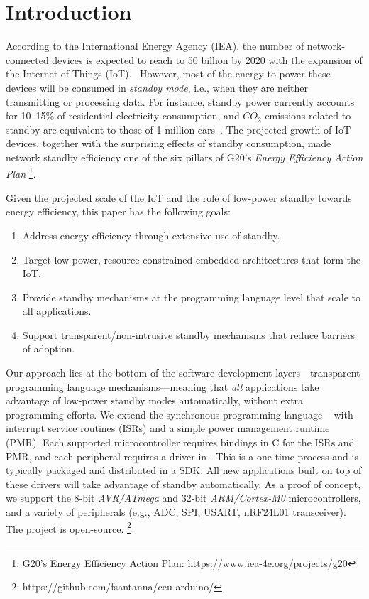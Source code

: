 \section{Introduction}
\label{sec.introduction}

According to the International Energy Agency (IEA), the number of
network-connected devices is expected to reach to 50 billion by 2020 with
the expansion of the Internet of Things (IoT).~\cite{iea.data}
%
However, most of the energy to power these devices will be consumed in
\emph{standby mode}, i.e., when they are neither transmitting or processing
data.
%
For instance, standby power currently accounts for 10--15\% of residential
electricity consumption, and $CO_2$ emissions related to standby are equivalent
to those of 1 million cars~\cite{iea.data,standby.australia}.
%
The projected growth of IoT devices, together with the surprising effects of
standby consumption, made network standby efficiency one of the six
pillars of G20's \emph{Energy Efficiency Action Plan}%
\footnote{G20's Energy Efficiency Action Plan: \url{https://www.iea-4e.org/projects/g20}}.

Given the projected scale of the IoT and the role of low-power standby towards
energy efficiency, this paper has the following goals:

\begin{enumerate}
\item Address energy efficiency through extensive use of standby.
\item Target low-power, resource-constrained embedded architectures that form
      the IoT.
\item Provide standby mechanisms at the programming language level that scale
      to all applications.
\item Support transparent/non-intrusive standby mechanisms that reduce barriers
      of adoption.
\end{enumerate}

Our approach lies at the bottom of the software development
layers---transparent programming language mechanisms---meaning that \emph{all}
applications take advantage of low-power standby modes automatically, without
extra programming efforts.
%
We extend the synchronous programming language
\CEU~\cite{ceu.sensys13,ceu.tecs17} with interrupt service routines (ISRs) and
a simple power management runtime (PMR).
%
Each supported microcontroller requires bindings in C for the ISRs and PMR, and
each peripheral requires a driver in \CEU.
This is a one-time process and is typically packaged and distributed in a SDK.
%
All new applications built on top of these drivers will take advantage of
standby automatically.
%
As a proof of concept, we support the 8-bit \emph{AVR/ATmega} and 32-bit
\emph{ARM/Cortex-M0} microcontrollers, and a variety of peripherals (e.g., ADC,
SPI, USART, nRF24L01 transceiver).
The project is open-source.%
\footnote{https://github.com/fsantanna/ceu-arduino/}

